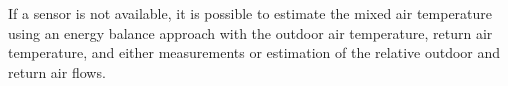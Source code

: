 If a sensor is not available, it is possible to estimate the mixed air
temperature using an energy balance approach with the outdoor air temperature,
return air temperature, and either measurements or estimation of the relative
outdoor and return air flows.








